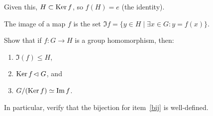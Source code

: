 Given this, $H\subset\operatorname{Ker} f$, so $f(H) = e$ (the identity).
\begin{defn}
The image of a map $f$ is the set $\Im f = \{y\in H\mid\exists x\in G: y = f(x)\}$.
\end{defn}
\begin{ex}
\label{firstiso}
Show that if $f:G\to H$ is a group homomorphism, then:
\begin{enumerate}
\item \label{imiso} $\Im(f) \le H$,
\item $\operatorname{Ker} f \!\vartriangleleft G$, and
\item \label{bij}$G/(\operatorname{Ker} f) \simeq \operatorname{Im} f$.
\end{enumerate}
In particular, verify that the bijection for item~\ref{bij} is well-defined.
\end{ex}
